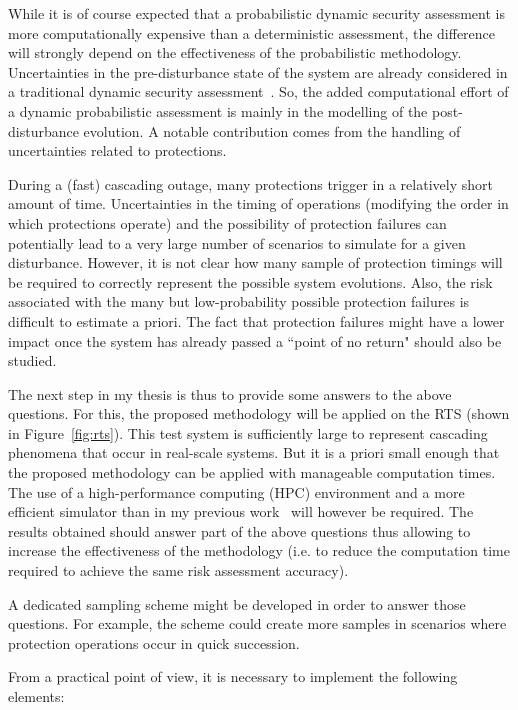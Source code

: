 While it is of course expected that a probabilistic dynamic security assessment is more computationally expensive than a deterministic assessment, the difference will strongly depend on the effectiveness of the probabilistic methodology. Uncertainties in the pre-disturbance state of the system are already considered in a traditional dynamic security assessment~\cite{EurostagHPC}. So, the added computational effort of a dynamic probabilistic assessment is mainly in the modelling of the post-disturbance evolution. A notable contribution comes from the handling of uncertainties related to protections.

During a (fast) cascading outage, many protections trigger in a relatively short amount of time. Uncertainties in the timing of operations (modifying the order in which protections operate) and the possibility of protection failures can potentially lead to a very large number of scenarios to simulate for a given disturbance. However, it is not clear how many sample of protection timings will be required to correctly represent the possible system evolutions. Also, the risk associated with the many but low-probability possible protection failures is difficult to estimate a priori. The fact that protection failures might have a lower impact once the system has already passed a ``point of no return" should also be studied.

The next step in my thesis is thus to provide some answers to the above questions. For this, the proposed methodology will be applied on the RTS (shown in Figure~\ref{fig:rts}). This test system is sufficiently large to represent cascading phenomena that occur in real-scale systems. But it is a priori small enough that the proposed methodology can be applied with manageable computation times. The use of a high-performance computing (HPC) environment and a more efficient simulator than in my previous work~\cite{MCDETasTool} will however be required. The results obtained should answer part of the above questions thus allowing to increase the effectiveness of the methodology (i.e. to reduce the computation time required to achieve the same risk assessment accuracy).

A dedicated sampling scheme might be developed in order to answer those questions. For example, the scheme could create more samples in scenarios where protection operations occur in quick succession.

From a practical point of view, it is necessary to implement the following elements:

